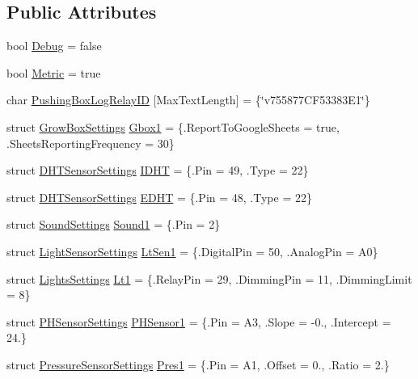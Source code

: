 \subsection*{Public Attributes}
\begin{DoxyCompactItemize}
\item 
bool \hyperlink{struct_settings_ae85fc15d5c9994d5249d43ff3009fbd5}{Debug} = false
\item 
bool \hyperlink{struct_settings_aaa7eb601917b369479553ede68e16581}{Metric} = true
\item 
char \hyperlink{struct_settings_af2e86b73866c5031676f9ee1db9101b0}{Pushing\+Box\+Log\+Relay\+ID} \mbox{[}Max\+Text\+Length\mbox{]} = \{\char`\"{}v755877\+C\+F53383\+E1\char`\"{}\}
\item 
struct \hyperlink{struct_settings_1_1_grow_box_settings}{Grow\+Box\+Settings} \hyperlink{struct_settings_a9553a9096683f0b10edbd92dea77fd97}{Gbox1} = \{.Report\+To\+Google\+Sheets = true, .Sheets\+Reporting\+Frequency = 30\}
\item 
struct \hyperlink{struct_settings_1_1_d_h_t_sensor_settings}{D\+H\+T\+Sensor\+Settings} \hyperlink{struct_settings_aa1cc318b5572edd7941321e8d941496c}{I\+D\+HT} = \{.Pin = 49, .Type = 22\}
\item 
struct \hyperlink{struct_settings_1_1_d_h_t_sensor_settings}{D\+H\+T\+Sensor\+Settings} \hyperlink{struct_settings_a53f7b575223ea3080634948b0497161c}{E\+D\+HT} = \{.Pin = 48, .Type = 22\}
\item 
struct \hyperlink{struct_settings_1_1_sound_settings}{Sound\+Settings} \hyperlink{struct_settings_a8a8e8440de1c81b9a0db84cc701c47e8}{Sound1} = \{.Pin = 2\}
\item 
struct \hyperlink{struct_settings_1_1_light_sensor_settings}{Light\+Sensor\+Settings} \hyperlink{struct_settings_a499fd8a31b36a6dc07df6719197b5d5e}{Lt\+Sen1} = \{.Digital\+Pin = 50, .Analog\+Pin = A0\}
\item 
struct \hyperlink{struct_settings_1_1_lights_settings}{Lights\+Settings} \hyperlink{struct_settings_a09771e5b5bdc58f62c2f38db6648b9ff}{Lt1} = \{.Relay\+Pin = 29, .Dimming\+Pin = 11, .Dimming\+Limit = 8\}
\item 
struct \hyperlink{struct_settings_1_1_p_h_sensor_settings}{P\+H\+Sensor\+Settings} \hyperlink{struct_settings_aef8cfb16058705f136a43edae7657165}{P\+H\+Sensor1} = \{.Pin = A3, .Slope = -\/0., .Intercept = 24.\}
\item 
struct \hyperlink{struct_settings_1_1_pressure_sensor_settings}{Pressure\+Sensor\+Settings} \hyperlink{struct_settings_a633ec2a87581e7bbd5e124b5cfb3fb80}{Pres1} = \{.Pin = A1, .Offset = 0., .Ratio = 2.\}

\end{DoxyCompactItemize}
